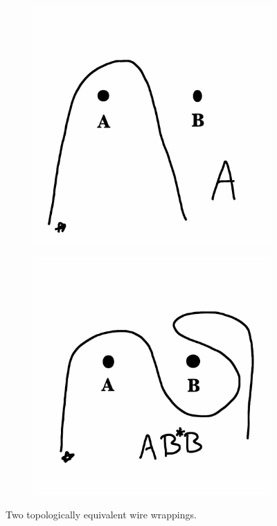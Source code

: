 \documentclass[12pt,letterpaper]{article}
\theoremstyle{definition}
\begin{document}
\begin{figure}[h]
    \centering
    \begin{subfigure}[b]{0.4\textwidth}
        \centering
        \includegraphics[width=\textwidth]{phppics/A.png}
     \end{subfigure}
     \qquad
     \begin{subfigure}[b]{0.4\textwidth}
         \centering
         \includegraphics[width=\textwidth]{phppics/ABsB.png}
     \end{subfigure}
\caption{Two topologically equivalent wire wrappings.}
\end{figure}
\end{document}
